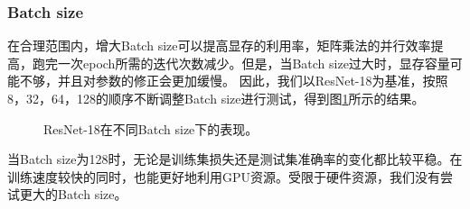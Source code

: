 \documentclass{article}
\theoremstyle{definition}
\begin{document}
\subsubsection{Batch size}
在合理范围内，增大Batch size可以提高显存的利用率，矩阵乘法的并行效率提高，跑完一次epoch所需的迭代次数减少。但是，当Batch size过大时，显存容量可能不够，并且对参数的修正会更加缓慢。
因此，我们以ResNet-18为基准，按照8，32，64，128的顺序不断调整Batch size进行测试，得到图\ref{fig:resnet18_batchsize}所示的结果。
\begin{figure}[H]
	\centering
	\caption{ResNet-18在不同Batch size下的表现。}
	\label{fig:resnet18_batchsize}
\end{figure}
当Batch size为128时，无论是训练集损失还是测试集准确率的变化都比较平稳。在训练速度较快的同时，也能更好地利用GPU资源。受限于硬件资源，我们没有尝试更大的Batch size。
\end{document}
